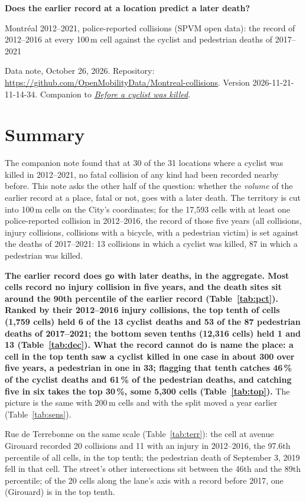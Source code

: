 \documentclass[11pt,letterpaper]{article}
\newcommand{\docversion}{2026-11-21-11-14-34} %
\newcommand{\repourl}{https://github.com/OpenMobilityData/Montreal-collisions}
\newcommand{\repo}[1]{\href{\repourl}{#1}}
\newcommand{\doc}[2]{\href{\repourl/blob/main/#1}{#2}}
\begin{document}
{\LARGE\bfseries Does the earlier record at a location predict a later death?}

{\large Montréal 2012--2021, police-reported collisions (SPVM open data): the record of 2012--2016 at every 100\,m cell against the cyclist and pedestrian deaths of 2017--2021}

\medskip
Data note, October 26, 2026. Repository: \repo{\repourl}. Version \docversion. Companion to \doc{derived/cyclist-fatality-locations/}{\emph{Before a cyclist was killed}}.

\section*{Summary}

The companion note found that at 30 of the 31 locations where a cyclist was killed in 2012--2021, no fatal collision of any kind had been recorded nearby before. This note asks the other half of the question: whether the \emph{volume} of the earlier record at a place, fatal or not, goes with a later death. The territory is cut into 100\,m cells on the City's coordinates; for the 17,593 cells with at least one police-reported collision in 2012--2016, the record of those five years (all collisions, injury collisions, collisions with a bicycle, with a pedestrian victim) is set against the deaths of 2017--2021: 13 collisions in which a cyclist was killed, 87 in which a pedestrian was killed.

\textbf{The earlier record does go with later deaths, in the aggregate. Most cells record no injury collision in five years, and the death sites sit around the 90th percentile of the earlier record (Table~\ref{tab:pct}). Ranked by their 2012--2016 injury collisions, the top tenth of cells (1,759 cells) held 6 of the 13 cyclist deaths and 53 of the 87 pedestrian deaths of 2017--2021; the bottom seven tenths (12,316 cells) held 1 and 13 (Table~\ref{tab:dec}). What the record cannot do is name the place: a cell in the top tenth saw a cyclist killed in one case in about 300 over five years, a pedestrian in one in 33; flagging that tenth catches 46\,\% of the cyclist deaths and 61\,\% of the pedestrian deaths, and catching five in six takes the top 30\,\%, some 5,300 cells (Table~\ref{tab:top}).} The picture is the same with 200\,m cells and with the split moved a year earlier (Table~\ref{tab:sens}).

Rue de Terrebonne on the same scale (Table~\ref{tab:terr}): the cell at avenue Girouard recorded 20 collisions and 11 with an injury in 2012--2016, the 97.6th percentile of all cells, in the top tenth; the pedestrian death of September 3, 2019 fell in that cell. The street's other intersections sit between the 46th and the 89th percentile; of the 20 cells along the lane's axis with a record before 2017, one (Girouard) is in the top tenth.
\end{document}
